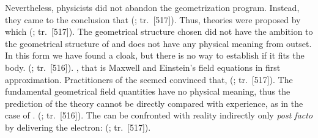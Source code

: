 \documentclass[draft]{article}
\renewcommand{\rzlap}[2]{(\cite[#1]{Reichenbach1928}; tr.\ [#2])\xspace}
\begin{document}
Nevertheless, physicists did not abandon the geometrization program. Instead, they came to the conclusion that  \rzlap{371}{517}. Thus, theories were proposed by  which  \rzlap{371}{517}. The geometrical structure chosen did not have the ambition to the geometrical structure of \spti and does not have any physical meaning from outset. In this form we have found a cloak, but there is no way to establish if it fits the body.  \rzlap{369}{516}. , that is Maxwell and Einstein's field equations in first approximation. Practitioners of the \uftp seemed convinced that, \q{[\textelp{i}n this \scare{guessing} the geometrical interpretation of electricity is supposed to be the guide} \rzlap{371}{517}. The fundamental geometrical field quantities have no physical meaning, thus the prediction of the theory cannot be directly compared with experience, as in the case of \gr. \rzlap{369}{516}. The \uft can be confronted with reality indirectly only \emph{post facto} by delivering the electron:  \rzlap{371}{517}. 


\end{document}
